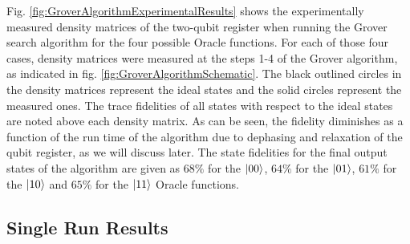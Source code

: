 Fig. \ref{fig:GroverAlgorithmExperimentalResults} shows the experimentally measured density matrices of the two-qubit register when running the Grover search algorithm for the four possible Oracle functions. For each of those four cases, density matrices were measured at the steps 1-4 of the Grover algorithm, as indicated in fig. \ref{fig:GroverAlgorithmSchematic}. The black outlined circles in the density matrices represent the ideal states and the solid circles represent the measured ones. The trace fidelities of all states with respect to the ideal states are noted above each density matrix. As can be seen, the fidelity diminishes as a function of the run time of the algorithm due to dephasing and relaxation of the qubit register, as we will discuss later. The state fidelities for the final output states of the algorithm are given as $68\%$ for the $\left| 00 \right>$, $64\%$ for the $\left| 01 \right>$, $61\%$ for the $\left| 10 \right>$ and $65\%$ for the $\left| 11 \right>$ Oracle functions.

\subsection{Single Run Results}

